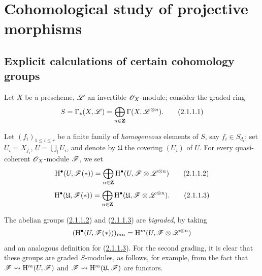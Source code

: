 \section{Cohomological study of projective morphisms}
\label{section:III.2}


\subsection{Explicit calculations of certain cohomology groups}
\label{subsection:III.2.1}

\begin{env}[2.1.1]
\label{III.2.1.1}
Let $X$ be a prescheme, $\mathscr{L}$ an invertible $\mathscr{O}_X$-module; consider the graded ring 
\[
\label{III.2.1.1.1}
  S = \Gamma_*(X,\mathscr{L}) = \bigoplus_{n\in\mathbf{Z}} \Gamma(X,\mathscr{L}^{\otimes n}).
  \tag{2.1.1.1}
\]

Let $(f_i)_{1\leq i\leq r}$ be a finite family of \emph{homogeneous} elements of $S$, say $f_i\in S_{d_i}$; set $U_i = X_{f_i}$, $U = \bigcup_i U_i$, and denote by $\mathfrak{U}$ the covering $(U_i)$ of $U$.
For every quasi-coherent $\mathscr{O}_X$-module $\mathscr{F}$, we set
\[
\label{III.2.1.1.2}
  \mathrm{H}^\bullet(U,\mathscr{F}(*)) = \bigoplus_{n\in\mathbf{Z}} \mathrm{H}^\bullet(U,\mathscr{F}\otimes\mathscr{L}^{\otimes n})
  \tag{2.1.1.2}
\]
\[
\label{III.2.1.1.3}
  \mathrm{H}^\bullet(\mathfrak{U},\mathscr{F}(*)) = \bigoplus_{n\in\mathbf{Z}} \mathrm{H}^\bullet(\mathfrak{U},\mathscr{F}\otimes\mathscr{L}^{\otimes n}).
  \tag{2.1.1.3}
\]

The abelian groups (\hyperref[III.2.1.1.2]{2.1.1.2}) and (\hyperref[III.2.1.1.3]{2.1.1.3}) are \emph{bigraded}, by taking
\[
  (\mathrm{H}^\bullet(U,\mathscr{F}(*)))_{mn} = \mathrm{H}^m(U,\mathscr{F}\otimes\mathscr{L}^{\otimes n})
\]
and an analogous definition for (\hyperref[III.2.1.1.3]{2.1.1.3}).
For the second grading, it is clear that these groups are graded $S$-modules, as follows, for example, from the fact that $\mathscr{F}\leadsto\mathrm{H}^m(U,\mathscr{F})$ and $\mathscr{F}\leadsto\mathrm{H}^m(\mathfrak{U},\mathscr{F})$ are functors.
\end{env}

